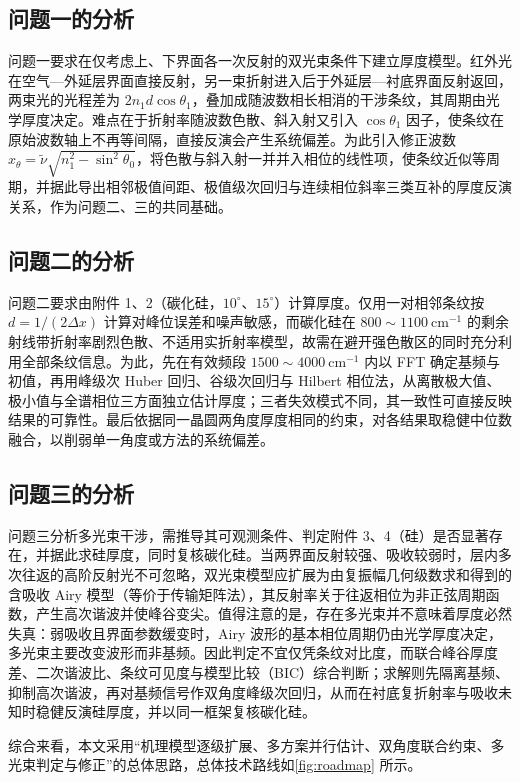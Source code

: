 \documentclass[withoutpreface,bwprint]{cumcmthesis}
\begin{document}
\subsection{问题一的分析}
问题一要求在仅考虑上、下界面各一次反射的双光束条件下建立厚度模型。红外光在空气—外延层界面直接反射，另一束折射进入后于外延层—衬底界面反射返回，两束光的光程差为 $2n_1 d\cos\theta_1$，叠加成随波数相长相消的干涉条纹，其周期由光学厚度决定。难点在于折射率随波数色散、斜入射又引入 $\cos\theta_1$ 因子，使条纹在原始波数轴上不再等间隔，直接反演会产生系统偏差。为此引入修正波数 $x_\theta=\tilde\nu\sqrt{n_1^2-\sin^2\theta_0}$，将色散与斜入射一并并入相位的线性项，使条纹近似等周期，并据此导出相邻极值间距、极值级次回归与连续相位斜率三类互补的厚度反演关系，作为问题二、三的共同基础。

\subsection{问题二的分析}
问题二要求由附件 1、2（碳化硅，$10^\circ$、$15^\circ$）计算厚度。仅用一对相邻条纹按 $d=1/(2\Delta x)$ 计算对峰位误差和噪声敏感，而碳化硅在 $800\sim1100\ \mathrm{cm^{-1}}$ 的剩余射线带折射率剧烈色散、不适用实折射率模型，故需在避开强色散区的同时充分利用全部条纹信息。为此，先在有效频段 $1500\sim4000\ \mathrm{cm^{-1}}$ 内以 FFT 确定基频与初值，再用峰级次 Huber 回归、谷级次回归与 Hilbert 相位法，从离散极大值、极小值与全谱相位三方面独立估计厚度；三者失效模式不同，其一致性可直接反映结果的可靠性。最后依据同一晶圆两角度厚度相同的约束，对各结果取稳健中位数融合，以削弱单一角度或方法的系统偏差。

\subsection{问题三的分析}
问题三分析多光束干涉，需推导其可观测条件、判定附件 3、4（硅）是否显著存在，并据此求硅厚度，同时复核碳化硅。当两界面反射较强、吸收较弱时，层内多次往返的高阶反射光不可忽略，双光束模型应扩展为由复振幅几何级数求和得到的含吸收 Airy 模型（等价于传输矩阵法），其反射率关于往返相位为非正弦周期函数，产生高次谐波并使峰谷变尖。值得注意的是，存在多光束并不意味着厚度必然失真：弱吸收且界面参数缓变时，Airy 波形的基本相位周期仍由光学厚度决定，多光束主要改变波形而非基频。因此判定不宜仅凭条纹对比度，而联合峰谷厚度差、二次谐波比、条纹可见度与模型比较（BIC）综合判断；求解则先隔离基频、抑制高次谐波，再对基频信号作双角度峰级次回归，从而在衬底复折射率与吸收未知时稳健反演硅厚度，并以同一框架复核碳化硅。

综合来看，本文采用“机理模型逐级扩展、多方案并行估计、双角度联合约束、多光束判定与修正”的总体思路，总体技术路线如\cref{fig:roadmap} 所示。
\end{document}

